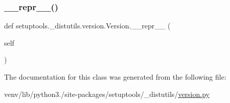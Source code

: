 \subsubsection{\texorpdfstring{\+\_\+\+\_\+repr\+\_\+\+\_\+()}{\_\_repr\_\_()}}
{\footnotesize\ttfamily def setuptools.\+\_\+distutils.\+version.\+Version.\+\_\+\+\_\+repr\+\_\+\+\_\+ (\begin{DoxyParamCaption}\item[{}]{self }\end{DoxyParamCaption})}



The documentation for this class was generated from the following file\+:\begin{DoxyCompactItemize}
\item 
venv/lib/python3./site-\/packages/setuptools/\+\_\+distutils/\hyperlink{setuptools_2__distutils_2version_8py}{version.\+py}\end{DoxyCompactItemize}
